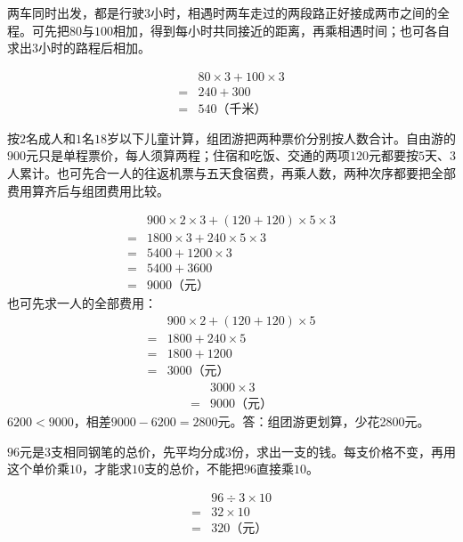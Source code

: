 \documentclass[multi=snippet,border=0pt]{standalone}
\newenvironment{snippet}[3]{\begin{minipage}{#1bp}\color{answerred}\fontsize{#2}{#3}\selectfont\raggedright}{\end{minipage}}
\begin{document}
\begin{snippet}{505}{11.5}{14}两车同时出发，都是行驶\(3\)小时，相遇时两车走过的两段路正好接成两市之间的全程。可先把\(80\)与\(100\)相加，得到每小时共同接近的距离，再乘相遇时间；也可各自求出\(3\)小时的路程后相加。\par \[\begin{aligned}&80\times3+100\times3\\={}&240+300\\={}&540\text{（千米）}\end{aligned}\]\end{snippet}
\begin{snippet}{505}{11.5}{14}按\(2\)名成人和\(1\)名\(18\)岁以下儿童计算，组团游把两种票价分别按人数合计。自由游的\(900\)元只是单程票价，每人须算两程；住宿和吃饭、交通的两项\(120\)元都要按\(5\)天、\(3\)人累计。也可先合一人的往返机票与五天食宿费，再乘人数，两种次序都要把全部费用算齐后与组团费用比较。\par \[\begin{aligned}&900\times2\times3+(120+120)\times5\times3\\={}&1800\times3+240\times5\times3\\={}&5400+1200\times3\\={}&5400+3600\\={}&9000\text{（元）}\end{aligned}\]也可先求一人的全部费用：\[\begin{aligned}&900\times2+(120+120)\times5\\={}&1800+240\times5\\={}&1800+1200\\={}&3000\text{（元）}\end{aligned}\]\[\begin{aligned}&3000\times3\\={}&9000\text{（元）}\end{aligned}\]\(6200<9000\)，相差\(9000-6200=2800\)元。答：组团游更划算，少花2800元。\end{snippet}
\begin{snippet}{505}{11.5}{14}\(96\)元是\(3\)支相同钢笔的总价，先平均分成\(3\)份，求出一支的钱。每支价格不变，再用这个单价乘\(10\)，才能求\(10\)支的总价，不能把\(96\)直接乘\(10\)。\par \[\begin{aligned}&96\div3\times10\\={}&32\times10\\={}&320\text{（元）}\end{aligned}\]\end{snippet}
\end{document}
